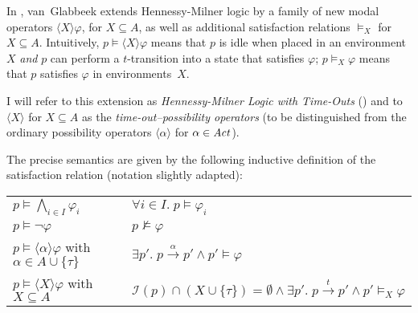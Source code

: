 %
\begin{isabellebody}%
%
%
\isadelimtheory
%
\endisadelimtheory
%
\isatagtheory
%
\endisatagtheory
{\isafoldtheory}%
%
\isadelimtheory
%
\endisadelimtheory
%
\isadelimdocument
%
\endisadelimdocument
%
\isatagdocument
%
\isamarkuptrue%
%
\endisatagdocument
{\isafolddocument}%
%
\isadelimdocument
%
\endisadelimdocument
%
\begin{isamarkuptext}%
\label{sec:HMLt}%
\end{isamarkuptext}\isamarkuptrue%
%
\begin{isamarkuptext}%
In \cite[Section 3]{rbs}, van~Glabbeek extends Hennessy-Milner logic by a family of new modal operators $\langle X \rangle \varphi$, for $X \subseteq A$, as well as additional satisfaction relations $\vDash_X$ for $X \subseteq A$. Intuitively, $p \vDash \langle X \rangle \varphi$ means that $p$ is idle when placed in an environment~$X$ \emph{and} $p$ can perform a $t$-transition into a state that satisfies $\varphi$; $p \vDash_X \varphi$ means that $p$ satisfies $\varphi$ in environments~$X$.

I will refer to this extension as \emph{Hennessy-Milner Logic with Time-Outs} (\HMLt{}) and to $\langle X \rangle$ for $X \subseteq A$ as the \emph{time-out--possibility operators} (to be distinguished from the ordinary possibility operators $\langle \alpha \rangle$ for $\alpha \in \mathit{Act}$).

The precise semantics are given by the following inductive definition of the satisfaction relation \cite[Section 3]{rbs} (notation slightly adapted):

\begin{tabular}{l l l}
    $p \vDash \bigwedge_{i \in I} \varphi_i$ 
    & \text{if} 
    & $\forall i \in I.\; p \vDash \varphi_i$ \\
    
    $p \vDash \neg\varphi$
    & \text{if} 
    & $p \not\vDash \varphi$ \\
    
    $p \vDash \langle \alpha \rangle \varphi$ \quad with $\alpha \in A \cup \{\tau\}$
    & \text{if} 
    & $\exists p'.\; p \xrightarrow{\alpha} p' \wedge p' \vDash \varphi$ \\
    
    $p \vDash \langle X \rangle \varphi$ \quad with $X \subseteq A$
    & \text{if} 
    & $\mathcal{I}(p) \cap (X \cup \{\tau\}) = \emptyset \wedge \exists p'.\; p \xrightarrow{t} p' \wedge p' \vDash_X \varphi$ \\[1em]
    

\end{tabular}
\end{isamarkuptext}
\end{isabellebody}
